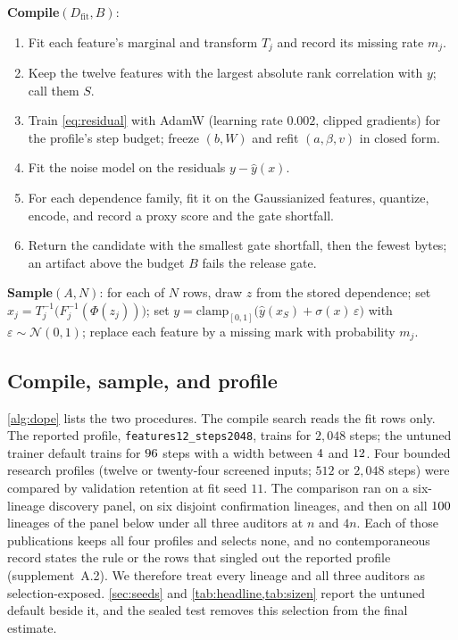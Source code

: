 \documentclass{article} %
\begin{document}
\begin{algorithm}[t]
\caption{DOPE compile and sample. Training reads the fit rows only; sampling reads the artifact only.}
\label{alg:dope}
\small
\textbf{Compile}$(D_{\mathrm{fit}}, B)$:
\begin{enumerate}[leftmargin=1.6em,itemsep=0pt,topsep=1pt]
  \item Fit each feature's marginal and transform $T_j$ and record its missing rate $m_j$.
  \item Keep the twelve features with the largest absolute rank correlation with $y$; call them $S$.
  \item Train \eqref{eq:residual} with AdamW (learning rate $0.002$, clipped gradients) for the profile's step budget; freeze $(b,W)$ and refit $(a,\beta,v)$ in closed form.
  \item Fit the noise model on the residuals $y-\hat{y}(x)$.
  \item For each dependence family, fit it on the Gaussianized features, quantize, encode, and record a proxy score and the gate shortfall.
  \item Return the candidate with the smallest gate shortfall, then the fewest bytes; an artifact above the budget $B$ fails the release gate.
\end{enumerate}
\textbf{Sample}$(A, N)$: for each of $N$ rows, draw $z$ from the stored dependence; set $x_j = T_j^{-1}\!\big(F_j^{-1}(\Phi(z_j))\big)$; set $y = \mathrm{clamp}_{[0,1]}\big(\hat{y}(x_S) + \sigma(x)\,\varepsilon\big)$ with $\varepsilon\sim\mathcal{N}(0,1)$; replace each feature by a missing mark with probability $m_j$.
\end{algorithm}

\subsection{Compile, sample, and profile}
\label{sec:compile}
\cref{alg:dope} lists the two procedures. The compile search reads the fit rows only. The reported profile, \texttt{features12\_\allowbreak{}steps2048}, trains for $2{,}048$ steps; the untuned trainer default trains for $96$ steps with a width between $4$ and $12$. Four bounded research profiles (twelve or twenty-four screened inputs; $512$ or $2{,}048$ steps) were compared by validation retention at fit seed $11$. The comparison ran on a six-lineage discovery panel, on six disjoint confirmation lineages, and then on all $100$ lineages of the panel below under all three auditors at $n$ and $4n$. Each of those publications keeps all four profiles and selects none, and no contemporaneous record states the rule or the rows that singled out the reported profile (supplement~A.2). We therefore treat every lineage and all three auditors as selection-exposed. \cref{sec:seeds} and \cref{tab:headline,tab:sizen} report the untuned default beside it, and the sealed test removes this selection from the final estimate.
\end{document}
